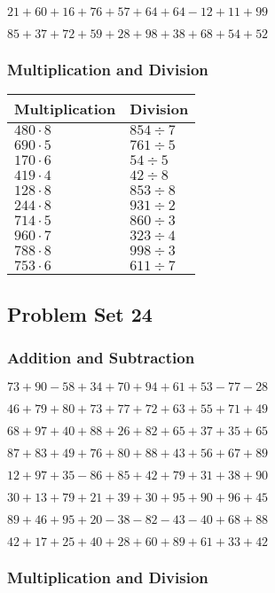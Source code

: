 \(21+60+16+76+57+64+64-12+11+99\)

\(85+37+72+59+28+98+38+68+54+52\)

\hypertarget{multiplication-and-division-22}{%
\subsubsection{Multiplication and
Division}\label{multiplication-and-division-22}}

\begin{longtable}[]{@{}ll@{}}
\toprule
Multiplication & Division\tabularnewline
\midrule
\endhead
\(480\cdot8\) & \(854÷7\)\tabularnewline
\(690\cdot5\) & \(761÷5\)\tabularnewline
\(170\cdot6\) & \(54÷5\)\tabularnewline
\(419\cdot4\) & \(42÷8\)\tabularnewline
\(128\cdot8\) & \(853÷8\)\tabularnewline
\(244\cdot8\) & \(931÷2\)\tabularnewline
\(714\cdot5\) & \(860÷3\)\tabularnewline
\(960\cdot7\) & \(323÷4\)\tabularnewline
\(788\cdot8\) & \(998÷3\)\tabularnewline
\(753\cdot6\) & \(611÷7\)\tabularnewline
\bottomrule
\end{longtable}

\hypertarget{problem-set-24}{%
\subsection{Problem Set 24}\label{problem-set-24}}

\hypertarget{addition-and-subtraction-23}{%
\subsubsection{Addition and
Subtraction}\label{addition-and-subtraction-23}}

\(73+90-58+34+70+94+61+53-77-28\)

\(46+79+80+73+77+72+63+55+71+49\)

\(68+97+40+88+26+82+65+37+35+65\)

\(87+83+49+76+80+88+43+56+67+89\)

\(12+97+35-86+85+42+79+31+38+90\)

\(30+13+79+21+39+30+95+90+96+45\)

\(89+46+95+20-38-82-43-40+68+88\)

\(42+17+25+40+28+60+89+61+33+42\)

\hypertarget{multiplication-and-division-23}{%
\subsubsection{Multiplication and
Division}\label{multiplication-and-division-23}}

